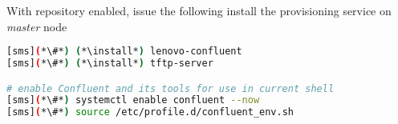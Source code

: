 With \Confluent{} repository enabled, issue the following install the provisioning
service on {\em master} node

\begin{lstlisting}[language=bash,keywords={}]
[sms](*\#*) (*\install*) lenovo-confluent
[sms](*\#*) (*\install*) tftp-server

# enable Confluent and its tools for use in current shell
[sms](*\#*) systemctl enable confluent --now
[sms](*\#*) source /etc/profile.d/confluent_env.sh
\end{lstlisting}
